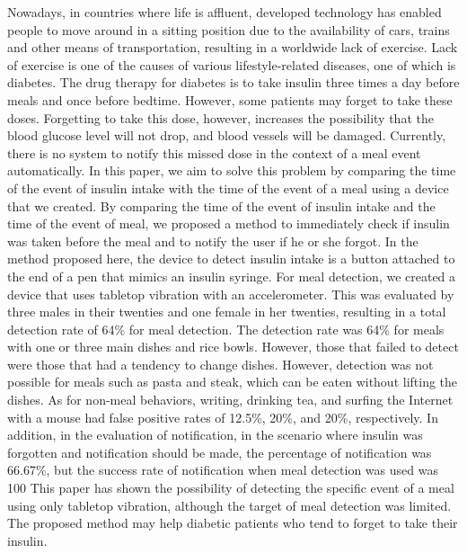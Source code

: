 \begin{eabstract}

  Nowadays, in countries where life is affluent, developed technology has enabled people to move around in a sitting position due to the availability of cars, trains and other means of transportation, resulting in a worldwide lack of exercise.
  Lack of exercise is one of the causes of various lifestyle-related diseases, one of which is diabetes. The drug therapy for diabetes is to take insulin three times a day before meals and once before bedtime. However, some patients may forget to take these doses.
  Forgetting to take this dose, however, increases the possibility that the blood glucose level will not drop, and blood vessels will be damaged. Currently, there is no system to notify this missed dose in the context of a meal event automatically.
  In this paper, we aim to solve this problem by comparing the time of the event of insulin intake with the time of the event of a meal using a device that we created.
  By comparing the time of the event of insulin intake and the time of the event of meal, we proposed a method to immediately check if insulin was taken before the meal and to notify the user if he or she forgot.
  In the method proposed here, the device to detect insulin intake is a button attached to the end of a pen that mimics an insulin syringe. For meal detection, we created a device that uses tabletop vibration with an accelerometer.
  This was evaluated by three males in their twenties and one female in her twenties, resulting in a total detection rate of 64\% for meal detection. The detection rate was 64\% for meals with one or three main dishes and rice bowls.
  However, those that failed to detect were those that had a tendency to change dishes. However, detection was not possible for meals such as pasta and steak, which can be eaten without lifting the dishes.
  As for non-meal behaviors, writing, drinking tea, and surfing the Internet with a mouse had false positive rates of 12.5\%, 20\%, and 20\%, respectively.
  In addition, in the evaluation of notification, in the scenario where insulin was forgotten and notification should be made, the percentage of notification was 66.67\%, but the success rate of notification when meal detection was used was 100%
  This paper has shown the possibility of detecting the specific event of a meal using only tabletop vibration, although the target of meal detection was limited.
  The proposed method may help diabetic patients who tend to forget to take their insulin.

\end{eabstract}
